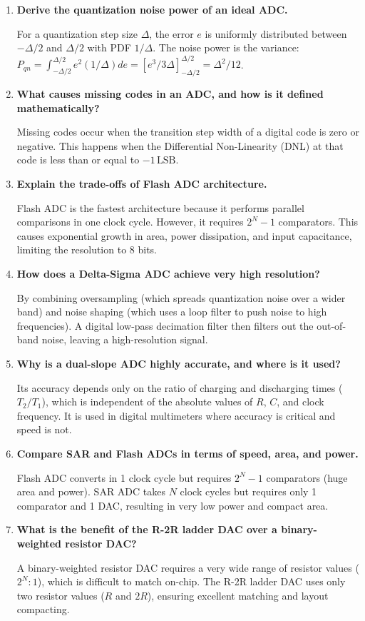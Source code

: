 \documentclass[12pt,a4paper]{article}
\newcommand{\Q}[1]{\textbf{#1}\par\noindent\ignorespaces}
\begin{document}
\begin{tcolorbox}[exambox, title={\textbf{Frequently Asked / Viva Questions}}]
\begin{enumerate}[topsep=0pt, label=\textbf{Q\arabic*.}, itemsep=5pt]
  \item \Q{Derive the quantization noise power of an ideal ADC.}
    For a quantization step size $\Delta$, the error $e$ is uniformly distributed between $-\Delta/2$ and $\Delta/2$ with PDF $1/\Delta$. The noise power is the variance: $P_{qn} = \int_{-\Delta/2}^{\Delta/2} e^2 (1/\Delta) de = [e^3/3\Delta]_{-\Delta/2}^{\Delta/2} = \Delta^2/12$.
  \item \Q{What causes missing codes in an ADC, and how is it defined mathematically?}
    Missing codes occur when the transition step width of a digital code is zero or negative. This happens when the Differential Non-Linearity (DNL) at that code is less than or equal to $-1\,\text{LSB}$.
  \item \Q{Explain the trade-offs of Flash ADC architecture.}
    Flash ADC is the fastest architecture because it performs parallel comparisons in one clock cycle. However, it requires $2^N - 1$ comparators. This causes exponential growth in area, power dissipation, and input capacitance, limiting the resolution to 8 bits.
  \item \Q{How does a Delta-Sigma ADC achieve very high resolution?}
    By combining oversampling (which spreads quantization noise over a wider band) and noise shaping (which uses a loop filter to push noise to high frequencies). A digital low-pass decimation filter then filters out the out-of-band noise, leaving a high-resolution signal.
  \item \Q{Why is a dual-slope ADC highly accurate, and where is it used?}
    Its accuracy depends only on the ratio of charging and discharging times ($T_2/T_1$), which is independent of the absolute values of $R$, $C$, and clock frequency. It is used in digital multimeters where accuracy is critical and speed is not.
  \item \Q{Compare SAR and Flash ADCs in terms of speed, area, and power.}
    Flash ADC converts in 1 clock cycle but requires $2^N-1$ comparators (huge area and power). SAR ADC takes $N$ clock cycles but requires only 1 comparator and 1 DAC, resulting in very low power and compact area.
  \item \Q{What is the benefit of the R-2R ladder DAC over a binary-weighted resistor DAC?}
    A binary-weighted resistor DAC requires a very wide range of resistor values ($2^N:1$), which is difficult to match on-chip. The R-2R ladder DAC uses only two resistor values ($R$ and $2R$), ensuring excellent matching and layout compacting.

\end{enumerate}
\end{tcolorbox}
\end{document}
